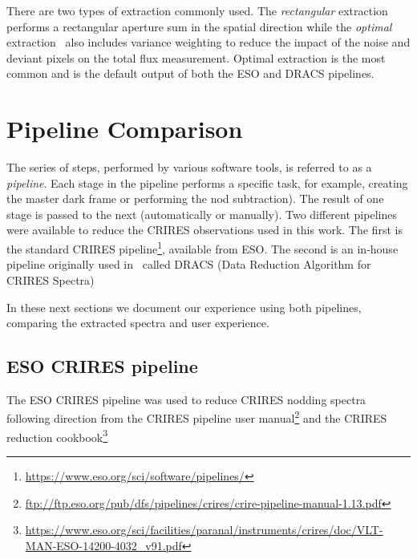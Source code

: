 There are two types of extraction commonly used. The \emph{rectangular} extraction performs a rectangular aperture sum in the spatial direction while the \emph{optimal} extraction~\citep{horne_optimal_1986} also includes variance weighting to reduce the impact of the noise and deviant pixels on the total flux measurement. Optimal extraction is the most common and is the default output of both the ESO and DRACS pipelines.

\section{Pipeline Comparison}
The series of steps, performed by various software tools, is referred to as a \emph{pipeline}. Each stage in the pipeline performs a specific task, for example, creating the master dark frame or performing the nod subtraction). The result of one stage is passed to the next (automatically or manually). Two different pipelines were available to reduce the CRIRES observations used in this work. The first is the standard CRIRES pipeline\footnote{\href{https://www.eso.org/sci/software/pipelines/}{https://www.eso.org/sci/software/pipelines/}}, available from ESO.
The second is an in-house pipeline originally  used in~\citet{figueira_radial_2010} called DRACS (Data Reduction Algorithm for CRIRES Spectra) 

In these next sections we document our experience using both pipelines, comparing the extracted spectra and user experience.


\subsection{ESO CRIRES pipeline}
The ESO CRIRES pipeline was used to reduce CRIRES nodding spectra following direction from the CRIRES pipeline user manual\footnote{\href{ftp://ftp.eso.org/pub/dfs/pipelines/crires/crire-pipeline-manual-1.13.pdf}{ftp://ftp.eso.org/pub/dfs/pipelines/crires/crire-pipeline-manual-1.13.pdf}} and the CRIRES reduction cookbook\footnote{\href{https://www.eso.org/sci/facilities/paranal/instruments/crires/doc/VLT-MAN-ESO-14200-4032\_v91.pdf}{https://www.eso.org/sci/facilities/paranal/instruments/crires/doc/VLT-MAN-ESO-14200-4032\_v91.pdf}}

